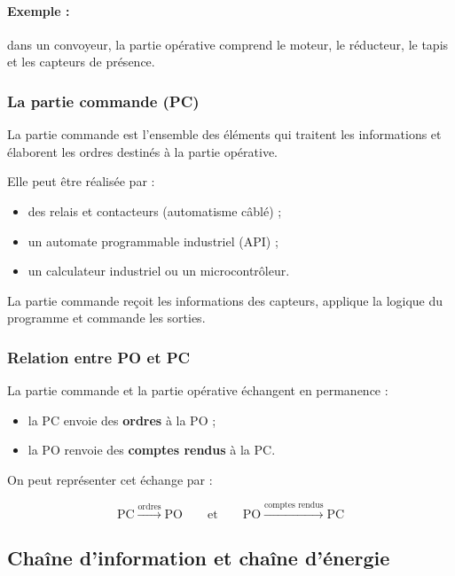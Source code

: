 \paragraph{Exemple :} dans un convoyeur, la partie opérative comprend le moteur, le réducteur, le tapis et les capteurs de présence.

\subsubsection{La partie commande (PC)}

La partie commande est l'ensemble des éléments qui traitent les informations et élaborent les ordres destinés à la partie opérative.

Elle peut être réalisée par :

\begin{itemize}
    \item des relais et contacteurs (automatisme câblé) ;
    \item un automate programmable industriel (API) ;
    \item un calculateur industriel ou un microcontrôleur.
\end{itemize}

La partie commande reçoit les informations des capteurs, applique la logique du programme et commande les sorties.

\subsubsection{Relation entre PO et PC}

La partie commande et la partie opérative échangent en permanence :

\begin{itemize}
    \item la PC envoie des \textbf{ordres} à la PO ;
    \item la PO renvoie des \textbf{comptes rendus} à la PC.
\end{itemize}

On peut représenter cet échange par :

\[
\text{PC} \xrightarrow{\text{ordres}} \text{PO}
\qquad \text{et} \qquad
\text{PO} \xrightarrow{\text{comptes rendus}} \text{PC}
\]

\subsection{Chaîne d'information et chaîne d'énergie}

